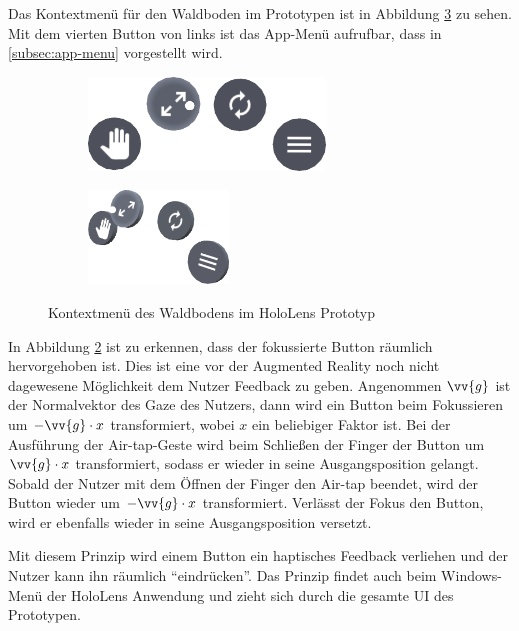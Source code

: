 Das Kontextmenü für den Waldboden im Prototypen ist in Abbildung \ref{fig:context-menu} zu sehen. Mit dem vierten Button von links ist das App-Menü aufrufbar, dass in \ref{subsec:app-menu} vorgestellt wird. 

\begin{figure}[htb]
  \centering
  \begin{subfigure}[b]{\fwidth}
    \centering
    \includegraphics[height=2.5cm]{figures/context-menu-front}
     \label{fig:context-menu-front}
  \end{subfigure}
  \begin{subfigure}[b]{\fwidth}
    \centering
  	\includegraphics[height=2.5cm]{figures/context-menu-side}
  	 \label{fig:context-menu-side}
  \end{subfigure}
  \caption{Kontextmenü des Waldbodens im HoloLens Prototyp} \label{fig:context-menu}
\end{figure}

In Abbildung \ref{fig:context-menu-side} ist zu erkennen, dass der fokussierte Button räumlich hervorgehoben ist. Dies ist eine vor der Augmented Reality noch nicht dagewesene Möglichkeit dem Nutzer Feedback zu geben. Angenommen $\vv{g}$ ist der Normalvektor des Gaze des Nutzers, dann wird ein Button beim Fokussieren um $-\vv{g} \cdot x$ transformiert, wobei $x$ ein beliebiger Faktor ist. Bei der Ausführung der Air-tap-Geste wird beim Schließen der Finger der Button um $\vv{g} \cdot x$ transformiert, sodass er wieder in seine Ausgangsposition gelangt. Sobald der Nutzer mit dem Öffnen der Finger den Air-tap beendet, wird der Button wieder um $-\vv{g} \cdot x$ transformiert. Verlässt der Fokus den Button, wird er ebenfalls wieder in seine Ausgangsposition versetzt.

Mit diesem Prinzip wird einem Button ein haptisches Feedback verliehen und der Nutzer kann ihn räumlich "`eindrücken"'. Das Prinzip findet auch beim Windows-Menü der HoloLens Anwendung und zieht sich durch die gesamte UI des Prototypen.

